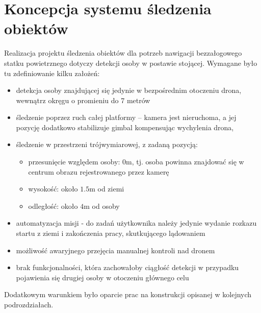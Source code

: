 \chapter{Koncepcja systemu śledzenia obiektów}
\label{sec:koncepcja}
Realizacja projektu śledzenia obiektów dla potrzeb nawigacji bezzałogowego statku powietrznego dotyczy detekcji osoby w postawie stojącej. Wymagane było tu zdefiniowanie kilku założeń:
\begin{itemize}
	\item detekcja osoby znajdującej się jedynie w bezpośrednim otoczeniu drona, wewnątrz okręgu o promieniu do 7 metrów
	\item śledzenie poprzez ruch całej platformy -- kamera jest nieruchoma, a jej pozycję dodatkowo stabilizuje gimbal kompensując wychylenia drona,
	\item śledzenie w przestrzeni trójwymiarowej, z zadaną pozycją:
	\begin{itemize}
		\item przesunięcie względem osoby: $0$m, tj. osoba powinna znajdować się w centrum obrazu rejestrowanego przez kamerę
		\item wysokość: około $1.5$m od ziemi
		\item odległość: około $4$m od osoby
	\end{itemize} 
	\item automatyzacja misji - do zadań użytkownika należy jedynie wydanie rozkazu startu z ziemi i zakończenia pracy, skutkującego lądowaniem
	\item możliwość awaryjnego przejęcia manualnej kontroli nad dronem
	\item brak funkcjonalności, która zachowałoby ciągłość detekcji w przypadku pojawienia się drugiej osoby w otoczeniu głównego celu
\end{itemize}

Dodatkowym warunkiem było oparcie prac na konstrukcji opisanej w kolejnych podrozdziałach.

